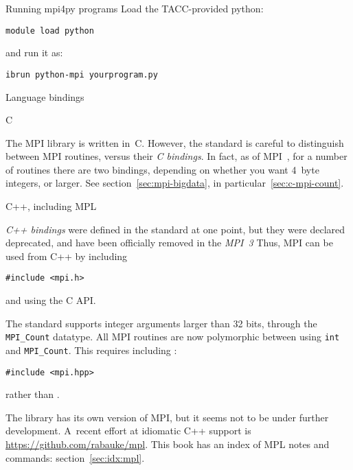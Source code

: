 \begin{tacc}
\begin{pythonnote}{Running mpi4py programs}
    Load the TACC-provided python:
\begin{verbatim}
module load python
\end{verbatim}
and run it as:
\begin{verbatim}
ibrun python-mpi yourprogram.py
\end{verbatim}
\end{pythonnote}
\end{tacc}

 {Language bindings}

 {C}

The MPI library is written in~C. 
However, the standard is careful to distinguish between MPI routines,
versus their \emph{C bindings}.
In fact, as of MPI~,
for a number of routines there are two bindings,
depending on whether you want 4~byte integers,
or larger.
See section~\ref{sec:mpi-bigdata},
in particular~\ref{sec:c-mpi-count}.


 {C++, including MPL}

\emph{C++ bindings} were defined in the standard at one point,
but they were declared deprecated,
and have been officially removed in the \emph{MPI~3}%
Thus, MPI can be used from C++ by including
\begin{verbatim}
#include <mpi.h>
\end{verbatim}
and using the C API.

\begin{mpifour}
  The  standard supports integer arguments larger than 32 bits,
  through the \lstinline+MPI_Count+ datatype.
  All MPI routines are now polymorphic between using
  \lstinline+int+ and \lstinline+MPI_Count+.
  This requires including :
\begin{verbatim}
#include <mpi.hpp>
\end{verbatim}
  rather than .
\end{mpifour}

The  library has its own version of MPI, but it seems
not to be under further development.  A~recent
effort at idiomatic C++ support is 
\url{https://github.com/rabauke/mpl}.
This book has an index of \ac{MPL} notes and commands:
section~\ref{sec:idx:mpl}.

